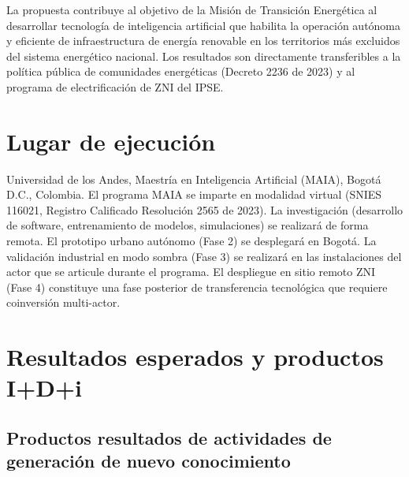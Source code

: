 \documentclass[12pt,letterpaper]{article}
\begin{document}
La propuesta contribuye al objetivo de la Misi\'on de Transici\'on Energ\'etica al desarrollar tecnolog\'ia de inteligencia artificial que habilita la operaci\'on aut\'onoma y eficiente de infraestructura de energ\'ia renovable en los territorios m\'as excluidos del sistema energ\'etico nacional. Los resultados son directamente transferibles a la pol\'itica p\'ublica de comunidades energ\'eticas (Decreto 2236 de 2023) y al programa de electrificaci\'on de ZNI del IPSE.

\section{Lugar de ejecuci\'on}

Universidad de los Andes, Maestr\'ia en Inteligencia Artificial (MAIA), Bogot\'a D.C., Colombia. El programa MAIA se imparte en modalidad virtual (SNIES 116021, Registro Calificado Resoluci\'on 2565 de 2023). La investigaci\'on (desarrollo de software, entrenamiento de modelos, simulaciones) se realizar\'a de forma remota. El prototipo urbano aut\'onomo (Fase 2) se desplegar\'a en Bogot\'a. La validaci\'on industrial en modo sombra (Fase 3) se realizar\'a en las instalaciones del actor que se articule durante el programa. El despliegue en sitio remoto ZNI (Fase 4) constituye una fase posterior de transferencia tecnol\'ogica que requiere coinversi\'on multi-actor.

\section{Resultados esperados y productos I+D+i}

\subsection{Productos resultados de actividades de generaci\'on de nuevo conocimiento}
\end{document}
